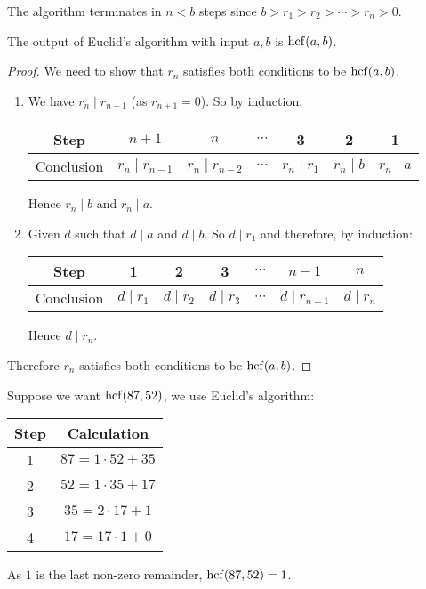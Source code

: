 \documentclass[../main.tex]{subfiles}
\begin{document}
\begin{remark}[Note]
  The algorithm terminates in $n < b$ steps since $b > r_1 > r_2 > \cdots > r_n > 0$.
\end{remark}
\begin{theorem}
  The output of Euclid's algorithm with input $a, b$ is $\operatorname{hcf}(a, b)$.
\end{theorem}
\begin{proof}
  We need to show that $r_n$ satisfies both conditions to be $\operatorname{hcf}(a, b)$.
  \begin{enumerate}
    \item We have $r_n \mid r_{n - 1}$ (as $r_{n + 1} = 0$).
      So by induction:
      \begin{center}
      \begin{tabular}{c|c|c|c|c|c|c}
        Step & $n + 1$ & $n$ & $\cdots$ & 3 & 2 & 1 \\
        \hline
        Conclusion & $r_n \mid r_{n - 1}$ & $r_n \mid r_{n-2}$ & $\cdots$ & $r_n \mid r_1$ & $r_n \mid b$ & $r_n \mid a$
      \end{tabular}
      \end{center}
      Hence $r_n \mid b$ and $r_n \mid a$.
    \item Given $d$ such that $d \mid a$ and $d \mid b$.
      So $d \mid r_1$ and therefore, by induction:
      \begin{center}
      \begin{tabular}{c|c|c|c|c|c|c}
        Step & 1 & 2 & 3 & $\cdots$ & $n - 1$ & $n$ \\
        \hline
        Conclusion & $d \mid r_1$ & $d \mid r_2$ & $d \mid r_3$ & $\cdots$ & $d \mid r_{n - 1}$ & $d \mid r_n$
      \end{tabular}
      \end{center}
      Hence $d \mid r_n$.
  \end{enumerate}
  Therefore $r_n$ satisfies both conditions to be $\operatorname{hcf}(a, b)$.
\end{proof}
\begin{example}
  Suppose we want $\operatorname{hcf}(87, 52)$, we use Euclid's algorithm:
  \begin{center}
  \begin{tabular}{c|c}
  Step & Calculation \\
  \hline
  1 & $87 = 1 \cdot 52 + 35$ \\
  2 & $52 = 1 \cdot 35 + 17$ \\
  3 & $35 = 2 \cdot 17 + 1$ \\
  4 & $17 = 17 \cdot 1 + 0$
  \end{tabular}
  \end{center}
  As $1$ is the last non-zero remainder, $\operatorname{hcf}(87, 52) = 1$.
\end{example}
\end{document}
